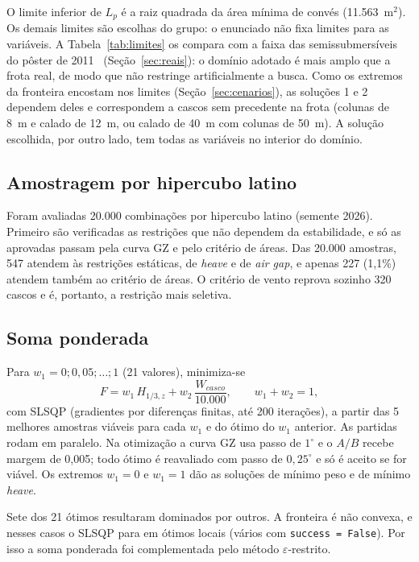\documentclass[11pt,a4paper]{article}
\newcommand{\Hz}{H_{1/3,z}}
\begin{document}
O limite inferior de $L_p$ é a raiz quadrada da área mínima de convés (11.563~m$^2$). Os demais
limites são escolhas do grupo: o enunciado não fixa limites para as variáveis. A
Tabela~\ref{tab:limites} os compara com a faixa das semissubmersíveis do pôster de
2011~\cite{poster} (Seção~\ref{sec:reais}): o domínio adotado é mais amplo que a frota real, de
modo que não restringe artificialmente a busca. Como os extremos da fronteira encostam nos
limites (Seção~\ref{sec:cenarios}), as soluções 1 e 2 dependem deles e correspondem a cascos sem
precedente na frota (colunas de 8~m e calado de 12~m, ou calado de 40~m com colunas de 50~m). A
solução escolhida, por outro lado, tem todas as variáveis no interior do domínio.

\subsection{Amostragem por hipercubo latino}

Foram avaliadas 20.000 combinações por hipercubo latino (semente 2026). Primeiro são verificadas
as restrições que não dependem da estabilidade, e só as aprovadas passam pela curva GZ e pelo
critério de áreas. Das 20.000 amostras, 547 atendem às restrições estáticas, de \emph{heave} e
de \emph{air gap}, e apenas 227 (1,1\%) atendem também ao critério de áreas. O critério de vento
reprova sozinho 320 cascos e é, portanto, a restrição mais seletiva.

\subsection{Soma ponderada}

Para $w_1 = 0; 0{,}05; \ldots; 1$ (21 valores), minimiza-se
\begin{equation}
F = w_1\, \Hz + w_2\, \frac{W_{casco}}{10.000}, \qquad w_1 + w_2 = 1 ,
\end{equation}
com SLSQP (gradientes por diferenças finitas, até 200 iterações), a partir das 5 melhores
amostras viáveis para cada $w_1$ e do ótimo do $w_1$ anterior. As partidas rodam em paralelo.
Na otimização a curva GZ usa passo de $1^\circ$ e o $A/B$ recebe margem de 0,005; todo ótimo é
reavaliado com passo de $0{,}25^\circ$ e só é aceito se for viável. Os extremos $w_1 = 0$ e
$w_1 = 1$ dão as soluções de mínimo peso e de mínimo \emph{heave}.

Sete dos 21 ótimos resultaram dominados por outros. A fronteira é não convexa, e nesses casos o
SLSQP para em ótimos locais (vários com \texttt{success = False}). Por isso a soma ponderada
foi complementada pelo método $\varepsilon$-restrito.
\end{document}

